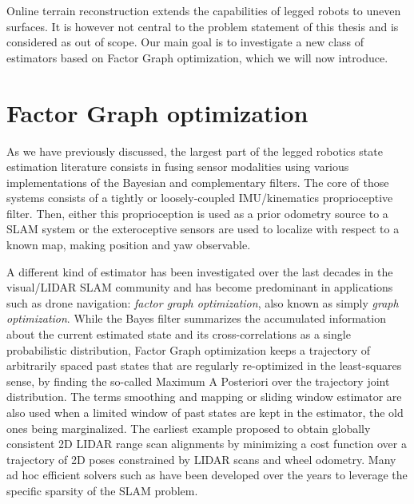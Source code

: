 Online terrain reconstruction extends the capabilities of legged robots to uneven surfaces. It is however not central to the problem statement of this thesis and is considered as
out of scope. Our main goal is to investigate a new class of estimators based on Factor Graph optimization, which we will now introduce. 


\section{Factor Graph optimization}
\label{sec:sota_factor_graph}
As we have previously discussed, the largest part of the legged robotics state estimation literature consists in fusing sensor modalities using various 
implementations of the Bayesian and complementary filters. The core of those systems consists of a tightly or loosely-coupled IMU/kinematics proprioceptive
filter. Then, either this proprioception is used as a prior odometry source to a SLAM system or the exteroceptive sensors are used to localize with respect to a known map,
making position and yaw observable.

A different kind of estimator has been investigated over the last decades in the visual/LIDAR SLAM community and has become predominant in applications
such as drone navigation: \textit{factor graph optimization}, also known as simply \textit{graph optimization}. 
While the Bayes filter summarizes  the accumulated information about the current estimated state and its cross-correlations as a single probabilistic distribution, 
Factor Graph optimization keeps a trajectory of arbitrarily spaced past states that are regularly re-optimized in the least-squares sense, by finding the so-called 
Maximum A Posteriori over the trajectory joint distribution. The terms smoothing and mapping or sliding window estimator are also used when a limited window of past states are kept 
in the estimator, the old ones being marginalized. The earliest example \cite{lu1997globally} proposed to obtain globally consistent 2D LIDAR range 
scan alignments by minimizing a cost function over a trajectory of 2D poses constrained by LIDAR scans and wheel odometry.
 Many ad hoc efficient solvers such as \cite{grisetti2011g2o, dellaert2012factor, ila2017slam++, ceres-solver} have been developed 
over the years to leverage the specific sparsity of the SLAM problem.

